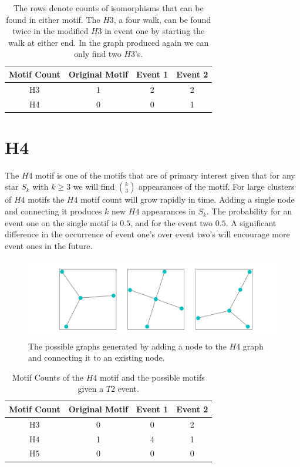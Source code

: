 \begin{table}[h!]
    \centering
        \begin{tabular}{||c c c c||} 
            \hline
            Motif Count & Original Motif & Event 1 & Event 2\\ [0.5ex] 
            \hline\hline
            H3 & 1 & 2 & 2\\ 
            \hline
            H4 & 0 & 0 & 1\\
            \hline
        \end{tabular}
        \caption{The rows denote counts of isomorphisms that can be found in either 
        motif. The $H3$, a four walk, can be found twice in the modified $H3$ in event one
        by starting the walk at either end. In the graph produced again we can only find
        two $H3$'s.}
        \label{table:1}
\end{table}

\section{H4}
The $H4$ motif is one of the motifs that are of primary interest given that for any star $S_k$
with $k \geq 3$ we will find ${k \choose 3}$ appearances of the motif. For large
clusters of $H4$ motifs the $H4$ motif count will grow rapidly in time. Adding a single node and connecting it produces $k$ new $H4$ appearances in $S_k$. The probability
for an event one on the single motif is $0.5$, and for the event two $0.5$. A significant
difference in the occurrence of event one's over event two's will encourage more event ones in the future. 

\begin{figure}[!ht]
    \includegraphics[width=14cm]{Images/H4_evolution.png}
    \centering
    \caption{The possible graphs generated by adding a node to the $H4$ graph 
    and connecting it to an existing node.}
    \label{fig:H4T2}
\end{figure}

\begin{table}[h!]
    \centering
    \begin{tabular}{||c c c c||} 
    \hline
    Motif Count & Original Motif & Event 1 & Event 2\\ [0.5ex] 
    \hline\hline
    H3 & 0 & 0 & 2\\ 
    \hline
    H4 & 1 & 4 & 1\\
    \hline
    H5 & 0 & 0 & 0\\
    \hline
   \end{tabular}
   \caption{Motif Counts of the $H4$ motif and the possible 
   motifs given a $T2$ event.}
    \label{table:2}
\end{table}


